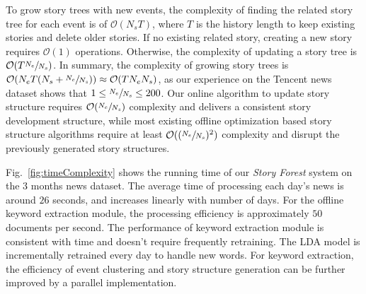 To grow story trees with new events, the complexity of finding the related story tree for each event is of $\mathcal{O}(N_s  T)$, where $T$ is the history length to keep existing stories and delete older stories. If no existing related story, creating a new story requires $\mathcal{O}{(1)}$ operations. Otherwise, the complexity of updating a story tree is $\mathcal{O}(T \sfrac{N_e}{N_s})$. In summary, the complexity of growing story trees is $\mathcal{O}(N_eT (N_s + \sfrac{N_e}{N_s})) \approx \mathcal{O}(T N_e  N_s)$, as our experience on the Tencent news dataset shows that $1 \leq \sfrac{N_e}{N_s} \leq 200$. Our online algorithm to update story structure requires $\mathcal{O}(\sfrac{N_e}{N_s})$ complexity and  delivers a consistent story development structure, while most existing offline optimization based story structure algorithms require at least $\mathcal{O}((\sfrac{N_e}{N_s})^2)$ complexity and disrupt the previously generated story structures.

Fig.~\ref{fig:timeComplexity} shows the running time of our \textit{Story Forest} system on the $3$ months news dataset. The average time of processing each day's news is around $26$ seconds, and increases linearly with number of days. 
For the offline keyword extraction module, the processing efficiency is approximately $50$ documents per second. The performance of keyword extraction module is consistent with time and doesn't require frequently retraining. The LDA model is incrementally retrained every day to handle new words. For keyword extraction, the efficiency of event clustering and story structure generation can be further improved by a parallel implementation.
